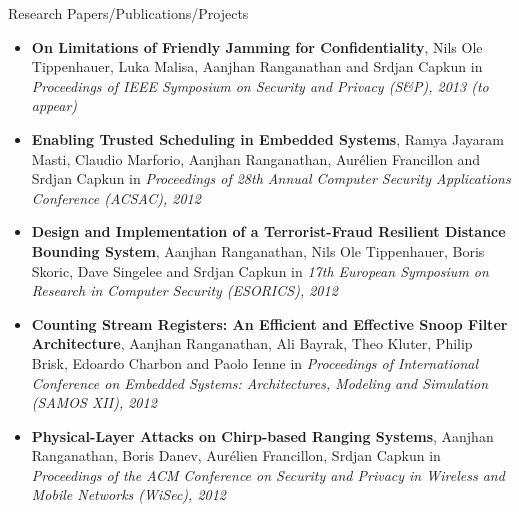 \documentclass[11pt,oneside]{article}
\newenvironment{ressection}[1]{
	\vspace{4pt}
	{\fontfamily{phv}\selectfont\Large#1}
	\begin{itemize}
	\vspace{3pt}
}{
	\end{itemize}
}
\newcommand{\resitem}[1]{
	\vspace{-4pt}
	\item \begin{flushleft} #1 \end{flushleft}
}
\begin{document}


\begin{ressection}{Research Papers/Publications/Projects}

  \resitem{\textbf{On Limitations of Friendly Jamming for Confidentiality},
    Nils Ole Tippenhauer, Luka Malisa, Aanjhan Ranganathan and Srdjan Capkun
    in \emph{Proceedings of IEEE Symposium on Security and Privacy (S\&P),
      2013 (to appear)}}

  \resitem{\textbf{Enabling Trusted Scheduling in Embedded Systems}, Ramya
    Jayaram Masti, Claudio Marforio, Aanjhan Ranganathan, Aur\'elien
    Francillon and Srdjan Capkun in \emph{Proceedings of 28th Annual Computer
      Security Applications Conference (ACSAC), 2012}}

        \resitem{\textbf{Design and Implementation of a Terrorist-Fraud Resilient
          Distance Bounding System}, Aanjhan Ranganathan, Nils Ole
          Tippenhauer, Boris Skoric, Dave Singelee and Srdjan Capkun in \emph{17th
          European Symposium on Research in Computer Security (ESORICS), 2012}}

        \resitem{\textbf{Counting Stream Registers: An Efficient and Effective Snoop
          Filter Architecture}, Aanjhan Ranganathan, Ali Bayrak, Theo Kluter,
          Philip Brisk, Edoardo Charbon and Paolo Ienne in \emph{Proceedings of
          International Conference on Embedded Systems: Architectures,
          Modeling and Simulation (SAMOS XII), 2012}}

        \resitem{\textbf{Physical-Layer Attacks on Chirp-based Ranging Systems},
          Aanjhan Ranganathan, Boris Danev, Aur\'elien Francillon, Srdjan
          Capkun in \emph{Proceedings of the ACM Conference on Security and Privacy
          in Wireless and Mobile Networks (WiSec), 2012}}


\end{ressection}
\end{document}
